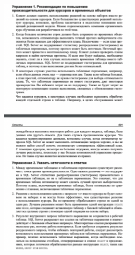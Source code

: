 \begin{figure}[h!]
	\begin{center}
		\includegraphics[width=0.6\textwidth]{img/eans20.png}
	\end{center}
	\captionsetup{justification=centering}
\end{figure}